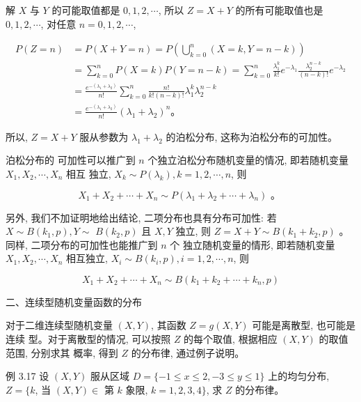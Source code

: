 \documentclass{beamer}
\begin{document}
	\begin{frame}
		解 $X$ 与 $Y$ 的可能取值都是 $0,1,2, \cdots$, 所以 $Z=X+Y$ 的所有可能取值也是 $0,1,2, \cdots$, 对任意 $n=0,1,2, \cdots$,
		
		$$
		\begin{aligned}
			P(Z=n) & =P(X+Y=n)=P\left(\bigcup_{k=0}^{n}(X=k, Y=n-k)\right) \\
			& =\sum_{k=0}^{n} P(X=k) P(Y=n-k)=\sum_{k=0}^{n} \frac{\lambda_{1}^{k}}{k !} e^{-\lambda_{1}} \frac{\lambda_{2}^{n-k}}{(n-k) !} e^{-\lambda_{2}} \\
			& =\frac{e^{-\left(\lambda_{1}+\lambda_{2}\right)}}{n !} \sum_{k=0}^{n} \frac{n !}{k !(n-k) !} \lambda_{1}^{k} \lambda_{2}^{n-k} \\
			& =\frac{e^{-\left(\lambda_{1}+\lambda_{2}\right)}}{n !}\left(\lambda_{1}+\lambda_{2}\right)^{n} 。
		\end{aligned}
		$$
		
		所以, $Z=X+Y$ 服从参数为 $\lambda_{1}+\lambda_{2}$ 的泊松分布, 这称为泊松分布的可加性。
	\end{frame}
	
	\begin{frame}
		泊松分布的 可加性可以推广到 $n$ 个独立泊松分布随机变量的情况, 即若随机变量 $X_{1}, X_{2}, \cdots, X_{n}$ 相互 独立, $X_{k} \sim P\left(\lambda_{k}\right), k=1,2, \cdots, n$, 则
		
		$$
		X_{1}+X_{2}+\cdots+X_{n} \sim P\left(\lambda_{1}+\lambda_{2}+\cdots+\lambda_{n}\right) \text { 。 }
		$$
		
		另外, 我们不加证明地给出结论, 二项分布也具有分布可加性: 若 $X \sim B\left(k_{1}, p\right), Y \sim$ $B\left(k_{2}, p\right)$ 且 $X, Y$ 独立, 则 $Z=X+Y \sim B\left(k_{1}+k_{2}, p\right)$ 。同样, 二项分布的可加性也能推广到 $n$ 个 独立随机变量的情形, 即若随机变量 $X_{1}, X_{2}, \cdots, X_{n}$ 相互独立, $X_{i} \sim B\left(k_{i}, p\right), i=1,2, \cdots, n$, 则
		
		$$
		X_{1}+X_{2}+\cdots+X_{n} \sim B\left(k_{1}+k_{2}+\cdots+k_{n}, p\right)
		$$
	\end{frame}
	
	\begin{frame}
		二、连续型随机变量函数的分布
		
		对于二维连续型随机变量 $(X, Y)$, 其函数 $Z=g(X, Y)$ 可能是离散型, 也可能是连续 型。对于离散型的情况, 可以按照 $Z$ 的每个取值, 根据相应 $(X, Y)$ 的取值范围, 分别求其 概率, 得到 $Z$ 的分布律, 通过例子说明。
		
		\vspace*{1cm}
		例 3.17 设 $(X, Y)$ 服从区域 $D=\{-1 \leqslant x \leqslant 2,-3 \leqslant y \leqslant 1\}$ 上的均匀分布, $Z=\{k$, 当 $(X, Y) \in$ 第 $k$ 象限, $k=1,2,3,4\}$, 求 $Z$ 的分布律。
	\end{frame}
	
\end{document}
